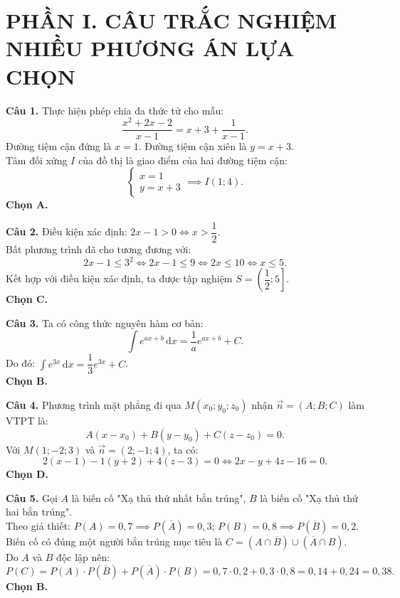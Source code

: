 \documentclass[12pt,a4paper]{article}
\begin{document}
\section*{\large PHẦN I. CÂU TRẮC NGHIỆM NHIỀU PHƯƠNG ÁN LỰA CHỌN}

\noindent\textbf{Câu 1.} Thực hiện phép chia đa thức tử cho mẫu:
\[
\dfrac{x^2 + 2x - 2}{x - 1} = x + 3 + \dfrac{1}{x - 1}.
\]
Đường tiệm cận đứng là $x = 1$. Đường tiệm cận xiên là $y = x + 3$.\\
Tâm đối xứng $I$ của đồ thị là giao điểm của hai đường tiệm cận:
\[
\begin{cases}
x = 1 \\
y = x + 3
\end{cases}
\implies I(1; 4).
\]
\textbf{Chọn A.}

\vspace{0.25cm}
\noindent\textbf{Câu 2.} Điều kiện xác định: $2x - 1 > 0 \iff x > \dfrac{1}{2}$.\\
Bất phương trình đã cho tương đương với:
\[
2x - 1 \le 3^2 \iff 2x - 1 \le 9 \iff 2x \le 10 \iff x \le 5.
\]
Kết hợp với điều kiện xác định, ta được tập nghiệm $S = \left(\dfrac{1}{2}; 5\right]$.\\
\textbf{Chọn C.}

\vspace{0.25cm}
\noindent\textbf{Câu 3.} Ta có công thức nguyên hàm cơ bản:
\[
\int e^{ax+b}\,\text{d}x = \dfrac{1}{a}e^{ax+b} + C.
\]
Do đó: $\int e^{3x}\,\text{d}x = \dfrac{1}{3}e^{3x} + C$.\\
\textbf{Chọn B.}

\vspace{0.25cm}
\noindent\textbf{Câu 4.} Phương trình mặt phẳng đi qua $M(x_0; y_0; z_0)$ nhận $\vec{n} = (A; B; C)$ làm VTPT là:
\[
A(x - x_0) + B(y - y_0) + C(z - z_0) = 0.
\]
Với $M(1; -2; 3)$ và $\vec{n} = (2; -1; 4)$, ta có:
\[
2(x - 1) - 1(y + 2) + 4(z - 3) = 0 \iff 2x - y + 4z - 16 = 0.
\]
\textbf{Chọn D.}

\vspace{0.25cm}
\noindent\textbf{Câu 5.} Gọi $A$ là biến cố "Xạ thủ thứ nhất bắn trúng", $B$ là biến cố "Xạ thủ thứ hai bắn trúng".\\
Theo giả thiết: $P(A) = 0{,}7 \implies P(\overline{A}) = 0{,}3$; $P(B) = 0{,}8 \implies P(\overline{B}) = 0{,}2$.\\
Biến cố có đúng một người bắn trúng mục tiêu là $C = (A \cap \overline{B}) \cup (\overline{A} \cap B)$.\\
Do $A$ và $B$ độc lập nên:
\[
P(C) = P(A) \cdot P(\overline{B}) + P(\overline{A}) \cdot P(B) = 0{,}7 \cdot 0{,}2 + 0{,}3 \cdot 0{,}8 = 0{,}14 + 0{,}24 = 0{,}38.
\]
\textbf{Chọn B.}
\end{document}
